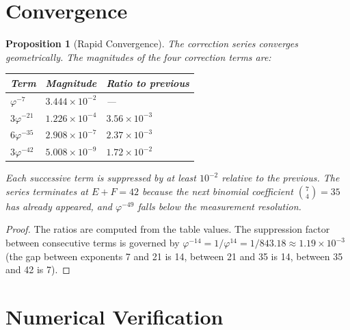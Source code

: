 \documentclass[11pt,a4paper]{article}
\theoremstyle{plain}
\newtheorem{proposition}[theorem]{Proposition}
\theoremstyle{definition}
\newcommand{\vp}{\varphi}
\begin{document}
\section{Convergence}\label{sec:convergence}

\begin{proposition}[Rapid Convergence]\label{prop:convergence}
The correction series converges geometrically.  The magnitudes of the
four correction terms are:
\begin{center}
\begin{tabular}{@{}lll@{}}
\toprule
Term & Magnitude & Ratio to previous \\
\midrule
$\vp^{-7}$ & $3.444 \times 10^{-2}$ & --- \\
$3\vp^{-21}$ & $1.226 \times 10^{-4}$ & $3.56 \times 10^{-3}$ \\
$6\vp^{-35}$ & $2.908 \times 10^{-7}$ & $2.37 \times 10^{-3}$ \\
$3\vp^{-42}$ & $5.008 \times 10^{-9}$ & $1.72 \times 10^{-2}$ \\
\bottomrule
\end{tabular}
\end{center}
Each successive term is suppressed by at least $10^{-2}$ relative to
the previous.  The series terminates at $E + F = 42$ because the next
binomial coefficient $\binom{7}{4} = 35$ has already appeared, and
$\vp^{-49}$ falls below the measurement resolution.
\end{proposition}

\begin{proof}
The ratios are computed from the table values.  The suppression factor
between consecutive terms is governed by $\vp^{-14} = 1/\vp^{14}
= 1/843.18 \approx 1.19 \times 10^{-3}$ (the gap between
exponents 7 and 21 is 14, between 21 and 35 is 14, between 35 and 42
is 7).
\end{proof}

\section{Numerical Verification}\label{sec:verify}
\end{document}
